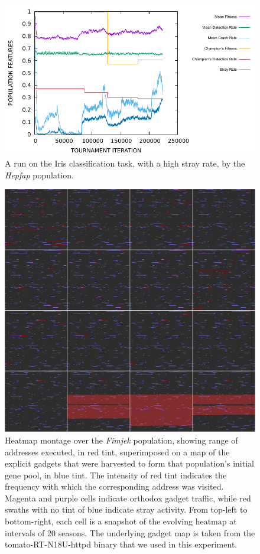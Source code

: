 \documentclass[12pt,glossary]{dalthesis}
\begin{document}
\begin{figure}[htbp]
\centering
\includegraphics[width=.9\linewidth]{../images/plots/hepfap.pdf}
\caption{\label{fig:orgb469c79}
A run on the Iris classification task, with a high stray rate, by the \emph{Hepfap} population.}
\end{figure}

\begin{figure}[htbp]
\centering
\includegraphics[width=.9\linewidth]{../images/plots/fimjek_heatmap_montage.pdf}
\caption{\label{fig:org637facd}
Heatmap montage over the \emph{Fimjek} population, showing range of addresses executed, in red tint, superimposed on a map of the explicit gadgets that were harvested to form that population's initial gene pool, in blue tint. The intensity of red tint indicates the frequency with which the corresponding address was visited. Magenta and purple cells indicate orthodox gadget traffic, while red swaths with no tint of blue indicate stray activity. From top-left to bottom-right, each cell is a snapshot of the evolving heatmap at intervals of 20 seasons. The underlying gadget map is taken from the tomato-RT-N18U-httpd binary that we used in this experiment.}
\end{figure}
\end{document}
